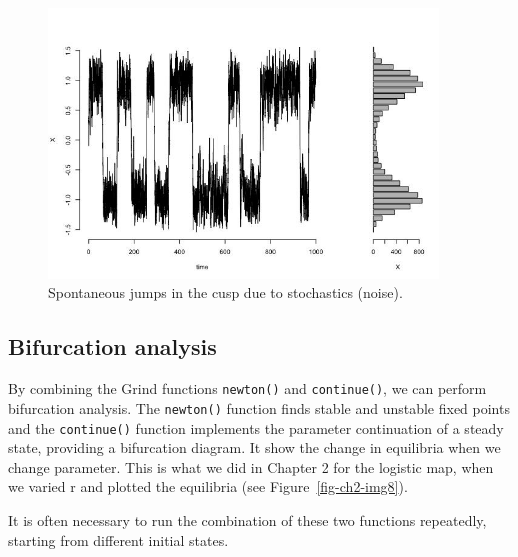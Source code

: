\documentclass[
  letterpaper,
]{scrbook}
\begin{document}
\begin{figure}

{\centering \includegraphics[width=4.07635in,height=\textheight]{media/ch5/image2.jpg}

}

\caption{\label{fig-ch5-img2-old-50}Spontaneous jumps in the cusp due to
stochastics (noise).}

\end{figure}

\hypertarget{bifurcation-analysis}{%
\subsection{Bifurcation analysis}\label{bifurcation-analysis}}

By combining the Grind functions \texttt{newton()} and
\texttt{continue()}, we can perform bifurcation analysis. The
\texttt{newton()} function finds stable and unstable fixed points and
the \texttt{continue()} function implements the parameter continuation
of a steady state, providing a bifurcation diagram. It show the change
in equilibria when we change parameter. This is what we did in Chapter 2
for the logistic map, when we varied r and plotted the equilibria (see
Figure~\ref{fig-ch2-img8}).

It is often necessary to run the combination of these two functions
repeatedly, starting from different initial states.
\end{document}
